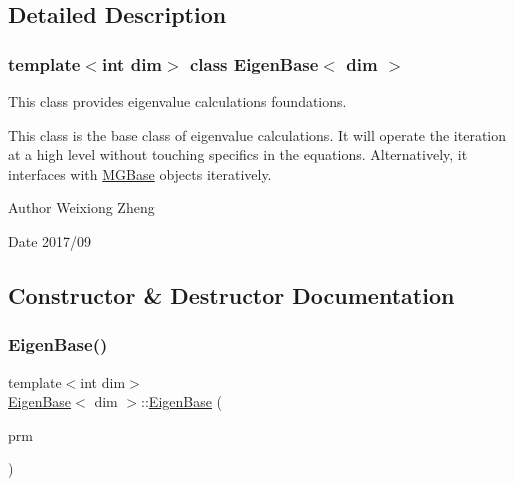 \subsection{Detailed Description}
\subsubsection*{template$<$int dim$>$\newline
class Eigen\+Base$<$ dim $>$}

This class provides eigenvalue calculations foundations. 

This class is the base class of eigenvalue calculations. It will operate the iteration at a high level without touching specifics in the equations. Alternatively, it interfaces with \hyperlink{class_m_g_base}{M\+G\+Base} objects iteratively.

\begin{DoxyAuthor}{Author}
Weixiong Zheng 
\end{DoxyAuthor}
\begin{DoxyDate}{Date}
2017/09 
\end{DoxyDate}


\subsection{Constructor \& Destructor Documentation}
\mbox{\label{class_eigen_base_a041823ed11437980ff73ada87a9717fe}} 
\subsubsection{\texorpdfstring{Eigen\+Base()}{EigenBase()}}
{\footnotesize\ttfamily template$<$int dim$>$ \\
\hyperlink{class_eigen_base}{Eigen\+Base}$<$ dim $>$\+::\hyperlink{class_eigen_base}{Eigen\+Base} (\begin{DoxyParamCaption}\item[{const Parameter\+Handler \&}]{prm }\end{DoxyParamCaption})}

\mbox{\label{class_eigen_base_afe9efbe26f3d5a427caa1d5022555038}} 

